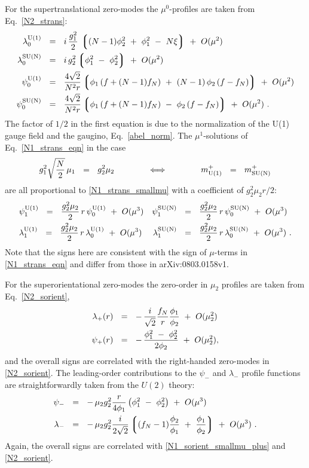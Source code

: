 \documentclass{article}
\newcommand{\lgr}{\left\lgroup}
\newcommand{\rgr}{\right\rgroup}
\newcommand{\mUp}{m_{\rm U(1)}^{+}}
\newcommand{\mNp}{m_{\rm SU(N)}^{+}}
\begin{document}
	For the supertranslational zero-modes the $ \mu^0 $-profiles are taken from Eq.~\eqref{N2_strans}:
\begin{align}
%
\notag
	\loU & ~~=~~ i\, \frac{g_1^2}{2}\, \lgr (N-1) \phi_2^2 ~+~ \phi_1^2 ~-~ N\xi \rgr  ~+~ O(\mu^2) 
	\\
%
\notag
	\loN & ~~=~~ i\, g_2^2 \lgr \phi_1^2 ~-~ \phi_2^2 \rgr ~+~ O(\mu^2)
	\\
%
\label{N1_strans_smallmu}
	\poU & ~~=~~ \frac{4\sqrt{2}}{N^2 r} \lgr \phi_1\, (f + (N-1) f_N) ~+~ (N-1)\, \phi_2\, (f-f_N) \rgr ~+~ O(\mu^2)
	\\
%
\notag
	\poN & ~~=~~ \frac{4\sqrt{2}}{N^2 r} \lgr \phi_1\, (f + (N-1) f_N) ~-~ \phi_2\, (f-f_N) \rgr ~+~ O(\mu^2)
	~.
\end{align}
	The factor of $ 1/2 $ in the first equation is due to the normalization of the U(1) gauge field and the
gaugino, Eq.~\eqref{abel_norm}.
	The $\mu^1$-solutions of Eq.~\eqref{N1_strans_eqn} in the case
\[
	g_1^2 \sqrt{\frac{N}{2}}\, \mu_1 ~~=~~ g_2^2 \mu_2  \qquad\qquad \Longleftrightarrow \qquad\qquad 
		\mUp  ~~=~~ \mNp
\]
	are all proportional
	to \eqref{N1_strans_smallmu} with a coefficient of $ g_2^2 \mu_2 r / 2 $:
\begin{align*}
%
	& \plU ~~=~~ \frac{g_2^2\mu_2}{2}\, r \, \poU ~+~ O(\mu^3)		& \plN &~~=~~ \frac{g_2^2\mu_2}{2}\, r\, \poN ~+~ O(\mu^3)  
	\\
%
	& \llU ~~=~~ \frac{g_2^2\mu_2}{2}\, r \, \loU ~+~ O(\mu^3)		& \llN &~~=~~ \frac{g_2^2\mu_2}{2}\, r\, \loN ~+~ O(\mu^3)~.
\end{align*}
Note that the signs here are consistent with the sign of $\mu$-terms in \eqref{N1_strans_eqn} and differ from
those in arXiv:0803.0158v1.

For the superorientational zero-modes the zero-order in $ \mu_2 $ profiles are taken from Eq.~\eqref{N2_sorient},
\begin{align}
%
\notag
 	\lambda_+(r) & ~~=~~ -\, \frac{i}{\sqrt{2}} \frac{f_N}{r} \frac{\phi_1}{\phi_2}  ~+~ O(\mu_2^2) \\
%
\label{N1_sorient_smallmu_plus}
	\psi_+(r) & ~~=~~ -\, \frac{\phi_1^2 ~-~ \phi_2^2}{2\phi_2} ~+~ O(\mu_2^2),
\end{align}
and the overall signs are correlated with the right-handed zero-modes in \eqref{N2_sorient}.
The leading-order contributions to the $ \psi_- $ and $ \lambda_- $ profile functions are straightforwardly taken from the $ U(2) $ theory:
\begin{align*}
%
	\psi_- & ~~=~~ -\, \mu_2 g_2^2 \frac{r}{4\phi_1} \left( \phi_1^2 ~-~ \phi_2^2 \right)  ~+~ O(\mu^3)
	\\ 
%
	\lambda_- & ~~=~~ -\, \mu_2 g_2^2 \frac{i}{2\sqrt{2}} \lgr (f_N - 1) \frac{\phi_2}{\phi_1} ~+~ \frac{\phi_1}{\phi_2} \rgr ~+~ O(\mu^3)~.
\end{align*}
Again, the overall signs are correlated with \eqref{N1_sorient_smallmu_plus} and \eqref{N2_sorient}.
\end{document}

